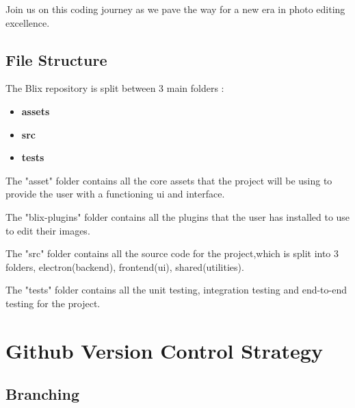 \documentclass[11pt,a4paper]{article}
\begin{document}
Join us on this coding journey as we pave the way for a new era in photo editing excellence.
\pagebreak


\subsection*{File Structure}


\DTsetlength{0.2em}{1em}{0.2em}{0.4pt}{0.4pt}
 
The Blix repository is split between 3 main folders :
\begin{itemize}
    \item[\textbullet] \textbf{assets}
    \item[\textbullet] \textbf{src}
    \item[\textbullet] \textbf{tests}

\end{itemize}

The "asset" folder contains all the core assets that the project will be using to provide the user with a functioning ui and interface.

The "blix-plugins" folder contains all the plugins that the user has installed to use to edit their images.

The "src" folder contains all the source code for the project,which is split into 3 folders, electron(backend), frontend(ui), shared(utilities).

The "tests" folder contains all the unit testing, integration testing and end-to-end testing for the project.

\section*{Github Version Control Strategy}

\subsection*{Branching}
\end{document}
